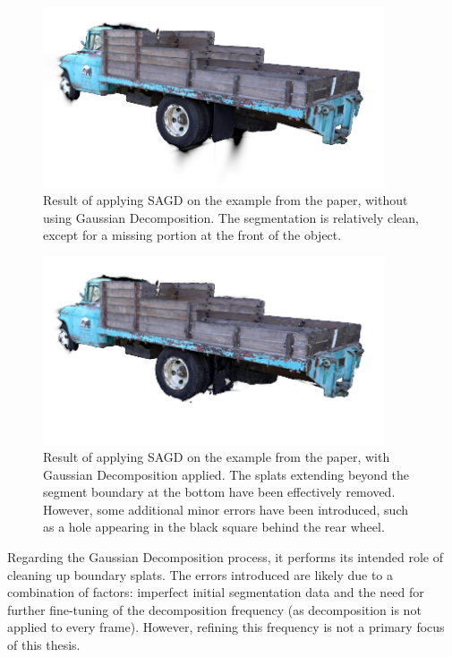 \documentclass[12pt]{article}
\begin{document}
\begin{figure}[h!]
	\centering
	\includegraphics[width=0.9\textwidth]{Images/nodecomp.png}
	\caption{Result of applying SAGD on the example from the paper, without using Gaussian Decomposition. The segmentation is relatively clean, except for a missing portion at the front of the object.}
	\label{fig:sagdwithout}
\end{figure}
\begin{figure}[h!]
	\centering
	\includegraphics[width=0.9\textwidth]{Images/withdecomp.png}
	\caption{Result of applying SAGD on the example from the paper, with Gaussian Decomposition applied. The splats extending beyond the segment boundary at the bottom have been effectively removed. However, some additional minor errors have been introduced, such as a hole appearing in the black square behind the rear wheel.}
	\label{fig:sagdwith}
\end{figure}
\FloatBarrier
\noindent
 Regarding the Gaussian Decomposition process, it performs its intended role of cleaning up boundary splats. The errors introduced are likely due to a combination of factors: imperfect initial segmentation data and the need for further fine-tuning of the decomposition frequency (as decomposition is not applied to every frame). However, refining this frequency is not a primary focus of this thesis.
\end{document}
